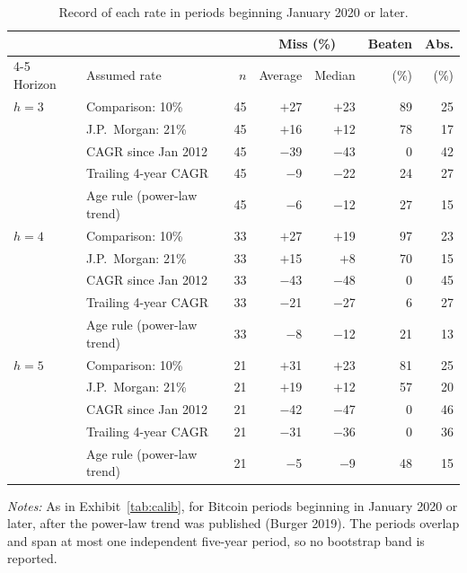 \documentclass[12pt]{article}
\theoremstyle{plain}
\theoremstyle{remark}
\begin{document}
\begin{table}[H]
\centering
\caption{Record of each rate in periods beginning January 2020 or later.}
\label{tab:postpub}
\footnotesize\setlength{\tabcolsep}{5pt}
\begin{tabular}{llrrrrr}
\toprule
 & & & \multicolumn{2}{c}{Miss (\%)} & Beaten & Abs.\\
\cmidrule(lr){4-5}
Horizon & Assumed rate & $n$ & Average & Median & (\%) & (\%)\\
\midrule
$h=3$ & Comparison: 10\% & 45 & $+$27 & $+$23 & 89 & 25 \\
 & J.P.\ Morgan: 21\% & 45 & $+$16 & $+$12 & 78 & 17 \\
 & CAGR since Jan 2012 & 45 & $-$39 & $-$43 & 0 & 42 \\
 & Trailing 4-year CAGR & 45 & $-$9 & $-$22 & 24 & 27 \\
 & Age rule (power-law trend) & 45 & $-$6 & $-$12 & 27 & 15 \\
\addlinespace
$h=4$ & Comparison: 10\% & 33 & $+$27 & $+$19 & 97 & 23 \\
 & J.P.\ Morgan: 21\% & 33 & $+$15 & $+$8 & 70 & 15 \\
 & CAGR since Jan 2012 & 33 & $-$43 & $-$48 & 0 & 45 \\
 & Trailing 4-year CAGR & 33 & $-$21 & $-$27 & 6 & 27 \\
 & Age rule (power-law trend) & 33 & $-$8 & $-$12 & 21 & 13 \\
\addlinespace
$h=5$ & Comparison: 10\% & 21 & $+$31 & $+$23 & 81 & 25 \\
 & J.P.\ Morgan: 21\% & 21 & $+$19 & $+$12 & 57 & 20 \\
 & CAGR since Jan 2012 & 21 & $-$42 & $-$47 & 0 & 46 \\
 & Trailing 4-year CAGR & 21 & $-$31 & $-$36 & 0 & 36 \\
 & Age rule (power-law trend) & 21 & $-$5 & $-$9 & 48 & 15 \\
\bottomrule
\end{tabular}
\par\smallskip
\begin{minipage}{\textwidth}\footnotesize
\emph{Notes:} As in Exhibit~\ref{tab:calib}, for Bitcoin periods beginning in January 2020 or later, after the power-law trend was published (Burger 2019). The periods overlap and span at most one independent five-year period, so no bootstrap band is reported.
\end{minipage}
\end{table}


\endgroup
\end{document}
